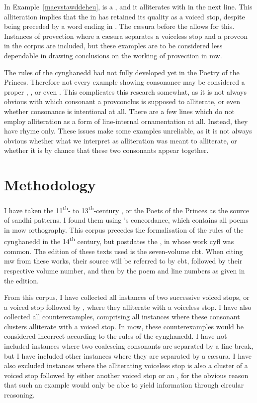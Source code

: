 In Example~\ref{maeystawddeheu},  is a , and it alliterates with  in the next line. This alliteration implies that the  in  has retained its quality as a voiced stop, despite being preceded by a word ending in . The cæsura before the  allows for this. Instances of provection where a cæsura separates a voiceless stop and a \gls{provcon} in the corpus are included, but these examples are to be considered less dependable in drawing conclusions on the working of provection in \gls{mw}.

The rules of the cynghanedd had not fully developed yet in the Poetry of the Princes. Therefore not every example showing consonance may be considered a proper , ,  or even . This complicates this research somewhat, as it is not always obvious with which consonant a \gls{provconclus} is supposed to alliterate, or even whether consonance is intentional at all. There are a few lines which do not employ alliteration as a form of line-internal ornamentation at all. Instead, they have rhyme only. These issues make some examples unreliable, as it is not always obvious whether what we interpret as alliteration was meant to alliterate, or whether it is by chance that these two consonants appear together.

\section{Methodology}
\label{sec:methodology}

I have taken the 11\textsuperscript{th}- to 13\textsuperscript{th}-century , or the Poets of the Princes as the source of sandhi patterns. I found them using \textcite{parry_owen_concordans_????}'s concordance, which contains all poems in \gls{mow} orthography. This corpus precedes the formalisation of the rules of the cynghanedd in the 14\textsuperscript{th} century, but postdates the , in whose work \gls{cyfl} was common. The edition of these texts used is the seven-volume \gls{cbt}. When citing \gls{mw} from these works, their source will be referred to by \acrshort{cbt}, followed by their respective volume number, and then by the poem and line numbers as given in the edition.  

From this corpus, I have collected all instances of two successive voiced stops, or a voiced stop followed by , where they alliterate with a voiceless stop. I have also collected all counterexamples, comprising all instances where these consonant clusters alliterate with a voiced stop. In \gls{mow}, these counterexamples would be considered incorrect according to the rules of the cynghanedd. I have not included instances where two coalescing consonants are separated by a line break, but I have included other instances where they are separated by a cæsura. I have also excluded instances where the alliterating voiceless stop is also a cluster of a voiced stop followed by either another voiced stop or an , for the obvious reason that such an example would only be able to yield information through circular reasoning. 

